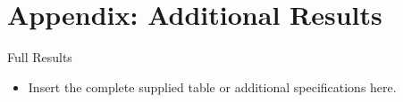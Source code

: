 \section{Appendix: Additional Results}

\begin{frame}[label=appendix-results]{Full Results}
  \begin{itemize}
    \item Insert the complete supplied table or additional specifications here.
  \end{itemize}
\end{frame}
